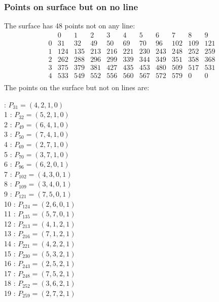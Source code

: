\documentclass{article}
\begin{document}
{\subsubsection*{Points on surface but on no line}
The surface has 48 points not on any line:\\
$$
\begin{array}{r|*{10}{r}}
 & 0 & 1 & 2 & 3 & 4 & 5 & 6 & 7 & 8 & 9\\
\hline
0 & 31 & 32 & 49 & 50 & 69 & 70 & 96 & 102 & 109 & 121\\
1 & 124 & 135 & 213 & 216 & 221 & 230 & 243 & 248 & 252 & 259\\
2 & 262 & 288 & 296 & 299 & 339 & 344 & 349 & 351 & 358 & 368\\
3 & 375 & 379 & 381 & 427 & 435 & 453 & 480 & 509 & 517 & 531\\
4 & 533 & 549 & 552 & 556 & 560 & 567 & 572 & 579 & 0 & 0\\
\end{array}
$$
The points on the surface but not on lines are:\\
\begin{multicols}{2}
 : $P_{31}=( 4, 2, 1, 0 )$\\
1 : $P_{32}=( 5, 2, 1, 0 )$\\
2 : $P_{49}=( 6, 4, 1, 0 )$\\
3 : $P_{50}=( 7, 4, 1, 0 )$\\
4 : $P_{69}=( 2, 7, 1, 0 )$\\
5 : $P_{70}=( 3, 7, 1, 0 )$\\
6 : $P_{96}=( 6, 2, 0, 1 )$\\
7 : $P_{102}=( 4, 3, 0, 1 )$\\
8 : $P_{109}=( 3, 4, 0, 1 )$\\
9 : $P_{121}=( 7, 5, 0, 1 )$\\
10 : $P_{124}=( 2, 6, 0, 1 )$\\
11 : $P_{135}=( 5, 7, 0, 1 )$\\
12 : $P_{213}=( 4, 1, 2, 1 )$\\
13 : $P_{216}=( 7, 1, 2, 1 )$\\
14 : $P_{221}=( 4, 2, 2, 1 )$\\
15 : $P_{230}=( 5, 3, 2, 1 )$\\
16 : $P_{243}=( 2, 5, 2, 1 )$\\
17 : $P_{248}=( 7, 5, 2, 1 )$\\
18 : $P_{252}=( 3, 6, 2, 1 )$\\
19 : $P_{259}=( 2, 7, 2, 1 )$\\

\end{multicols}}
\end{document}
